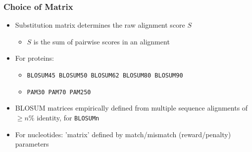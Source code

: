 \documentclass[table]{beamer}
\begin{document}
    \begin{frame}
     \frametitle{Choice of Matrix}
     \begin{itemize}
       \item Substitution matrix determines the raw alignment score $S$
       \begin{itemize}
         \item $S$ is the sum of pairwise scores in an alignment
       \end{itemize}
       \item For proteins:
       \begin{itemize}
         \item \texttt{BLOSUM45 BLOSUM50 BLOSUM62 BLOSUM80 BLOSUM90}
         \item \texttt{PAM30 PAM70 PAM250}
       \end{itemize}
       \item BLOSUM matrices empirically defined from multiple sequence alignments of $\geq n\%$ identity, for \texttt{BLOSUMn}
       \item For nucleotides: 'matrix' defined by match/mismatch (reward/penalty) parameters
     \end{itemize}
    \end{frame} 
  

\end{document}
